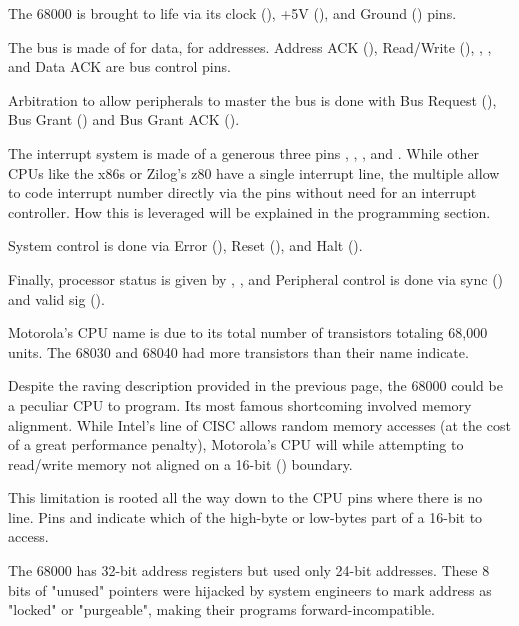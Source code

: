 The 68000 is brought to life via its clock (), +5V (), and Ground () pins.

The bus is made of  for data, \icode{A1-A23]} for addresses. Address ACK (), Read/Write (), , , and Data ACK  are bus control pins.


Arbitration to allow peripherals to master the bus is done with Bus Request (),  Bus Grant () and Bus Grant ACK ().

The interrupt system is made of a generous three pins , , , and . While other CPUs like the x86s or Zilog's z80 have a single interrupt line, the multiple  allow to code interrupt number directly via the pins without need for an interrupt controller. How this is leveraged will be explained in the programming section.


System control is done via Error (), Reset (), and Halt (). 

Finally, processor status is given by , ,  and Peripheral control is done via sync () and valid sig ().

\begin{trivia}
Motorola's CPU name is due to its total number of transistors totaling 68,000 units. The 68030 and 68040 had more transistors than their name indicate. 
\end{trivia}

Despite the raving description provided in the previous page, the 68000 could be a peculiar CPU to program. Its most famous shortcoming involved memory alignment. While Intel's line of CISC allows random memory accesses (at the cost of a great performance penalty), Motorola's CPU will  while attempting to read/write memory not aligned on a 16-bit () boundary.

This limitation is rooted all the way down to the CPU pins where there is no  line. Pins  and indicate which of the high-byte or low-bytes part of a 16-bit  to access.


\begin{trivia}
 The 68000 has 32-bit address registers but used only 24-bit addresses. These 8 bits of "unused" pointers were hijacked by system engineers to mark address as "locked" or "purgeable", making their programs forward-incompatible. 
\end{trivia}

